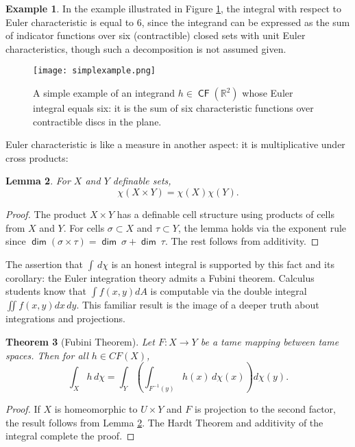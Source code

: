 \documentclass{psapm-l}
\newtheorem{theorem}{Theorem}[section]
\newtheorem{lemma}[theorem]{Lemma}
\theoremstyle{definition}
\newtheorem{example}[theorem]{Example}
\theoremstyle{remark}
\numberwithin{equation}{section}
\begin{document}
\begin{example}
In the example illustrated in Figure \ref{fig:simplexample}, the integral with respect to Euler characteristic is equal to $6$, since the integrand can be expressed as the sum of indicator functions over six (contractible) closed sets with unit Euler characteristics, though such a decomposition is not assumed given.
\begin{figure}[hbt]
\begin{center}
\texttt{[image: simplexample.png]}
\caption{A simple example of an integrand $h\in{{{\operatorname{\mathsf{{CF}}}}}}({{\mathbb R}}^2)$ whose Euler integral equals six: it is the sum of six characteristic functions over contractible discs in the plane.}
\label{fig:simplexample}
\end{center}
\end{figure}
\end{example}

Euler characteristic is like a measure in another aspect: it is multiplicative under cross products:
\begin{lemma}
\label{lem:chiproduct}
For $X$ and $Y$ definable sets,
\begin{equation}
    \chi(X\times Y) = \chi(X)\chi(Y).
\end{equation}
\end{lemma}
\begin{proof}
The product $X\times Y$ has a definable cell structure using products of cells from $X$ and $Y$. For cells $\sigma\subset X$ and $\tau\subset Y$, the lemma holds via the exponent rule since ${{{\operatorname{\mathsf{{dim}}}}}}(\sigma\times\tau)={{{\operatorname{\mathsf{{dim}}}}}}\ \sigma + {{{\operatorname{\mathsf{{dim}}}}}}\ \tau$. The rest follows from additivity.
\end{proof}

The assertion that $\int\,d\chi$ is an honest integral is supported by this fact and its corollary: the Euler integration theory admits a Fubini theorem. Calculus students know that $\int f(x,y)dA$ is computable via the double integral $\iint f(x,y)dx\,dy$. This familiar result is the image of a deeper truth about integrations and projections.

\begin{theorem}[Fubini Theorem]
\label{thm:fubini}
Let $F\colon X\to Y$ be a tame mapping between tame spaces. Then for all $h\in CF(X)$,
\begin{equation}
\label{eq:fubini}
    \int_X h\,d\chi = \int_Y \left( \int_{F^{-1}(y)}h(x)\,d\chi(x) \right) d\chi(y) .
\end{equation}
\end{theorem}
\begin{proof}
If $X$ is homeomorphic to $U\times Y$ and $F$ is projection to the second factor, the result follows from Lemma \ref{lem:chiproduct}. The Hardt Theorem
and additivity of the integral complete the proof.
\end{proof}
\end{document}
